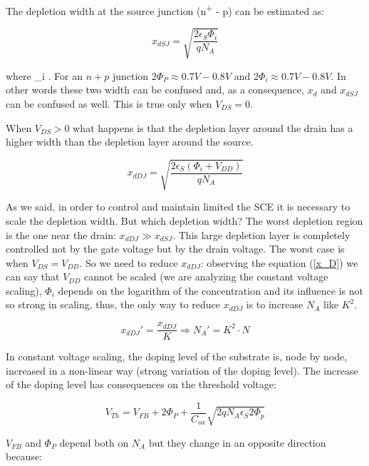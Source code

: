 \documentclass[a4paper, 12pt, twoside, openright]{report}
\newcommand{\super}{\textsuperscript}
\begin{document}
\begin{enumerate}
The depletion width at the source junction (n\super{+} - p) can be estimated as:

	\begin{equation}
	x_{dSJ} = \sqrt{\frac{2 \epsilon_S \Phi_i}{q N_A}} 
	\label{}
	\end{equation}

where \Phi_i \rightarrow {}.
For an $n+p$ junction $2 \Phi_P \approx 0.7 V - 0.8 V$ and $2 \Phi_i \approx 0.7 V - 0.8 V$. In other words these two width can be confused and, as a consequence, $x_{d}$ and $x_{dSJ}$ can be confused as well. This is true only when $V_{DS} = 0$.

When $V_{DS} > 0$ what happens is that the depletion layer around the drain has a higher width than the depletion layer around the source.

	\begin{equation}
	x_{dDJ} = \sqrt{\frac{2 \epsilon_S (\Phi_i + V_{DD})}{q N_A}}
	\label{x_D}
	\end{equation}

As we said, in order to control and maintain limited the SCE it is necessary to scale the depletion width. But which depletion width? The worst depletion region is the one near the drain: $x_{dDJ} \gg x_{dSJ}$. This large depletion layer is completely controlled not by the gate voltage but by the drain voltage. The worst case is when  $V_{DS} = V_{DD}$. So we need to reduce $x_{dDJ}$: observing the equation (\ref{x_D}) we can say that $V_{DD}$ cannot be scaled (we are analyzing the constant voltage scaling), $\Phi_i$ depends on the logarithm of the concentration and its influence is not so strong in scaling, thus, the only way to reduce $x_{dDJ}$ is to increase $N_{A}$ like $K^{2}$.

	\begin{equation}
	x_{dDJ}' = \frac{x_{dDJ}}{K} \Rightarrow N_A' = K^2 \cdot N
	\label{x_D}
	\end{equation}

In constant voltage scaling, the doping level of the substrate is, node by node, increased in a non-linear way (strong variation of the doping level). The increase of the doping level has consequences on the threshold voltage:

	\begin{equation}
	V_{Th} = V_{FB}+2\Phi_P+\frac{1}{C_{ox}}\sqrt{2qN_A\epsilon_S 2\Phi_p}
	\end{equation}

$V_{FB}$ and $\Phi_P$ depend both on $N_{A}$ but they change in an opposite direction because: 


\end{enumerate}
\end{document}
